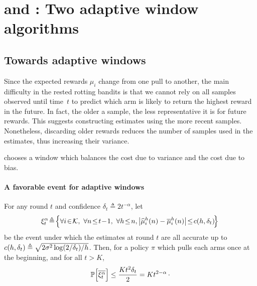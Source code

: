 \section{{\FEWA} and {\RAW} : Two adaptive window algorithms}
%
\subsection{Towards adaptive windows}
Since the expected rewards $\mu_i$ change from one pull to another, the main difficulty in the rested rotting bandits is that we cannot rely on all samples observed until time~$t$ to predict which arm is likely to return the highest reward in the future. In fact, the older a sample, the less representative it is for future rewards. This suggests constructing estimates using the more recent samples. Nonetheless, discarding older rewards reduces the number of samples used in the estimates, thus increasing their variance.

\SWA chooses a window which balances the cost due to variance and the cost due to bias. %


\paragraph{A favorable event for adaptive windows}
\begin{proposition}
\label{prop:prb_favorable_event}
For any round $t$ and confidence $\delta_{t} \triangleq 2t^{-\alpha}$, let 
%
\begin{equation}
\!\HPevent\! \triangleq\! \Big\{ \forall i\!\in\!\arms,\ \forall n \!\leq\! t\!-\!1 ,\ \forall h \!\leq\! n, \big| \hmu^h_i(n) - \bmu^h_i(n) \big| \!\leq\! c(h, \delta_{t}) \!\Big\}
\label{eq:def_favorable_event}
\end{equation}
 be the event under which the estimates at round $t$  are all accurate up to $c(h,\delta_{t}) \triangleq \sqrt{2 \sigma^2\log(2/\delta_t)/h}$. Then, for a policy $\pi$ which pulls each arms once at the beginning, and for all $t>K$,
\[
\mathbb{P}\Big[\overline{\xi^\alpha_t}\Big] \leq \frac{Kt^2\delta_{t}}{2}=Kt^{2-\alpha}\,\cdot
\]
\end{proposition} 

